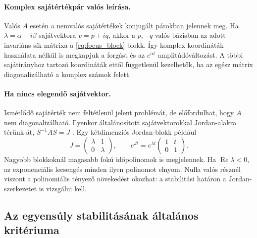 \paragraph*{Komplex sajátértékpár valós leírása.}
Valós $A$ esetén a nemvalós sajátértékek konjugált párokban jelennek meg. Ha $\lambda=\alpha+i\beta$ sajátvektora $v=p+iq$, akkor a $p,-q$ valós bázisban az adott invariáns sík mátrixa a \eqref{eq:focus_block} blokk. Így komplex koordináták használata nélkül is megkapjuk a forgást és az $e^{\alpha t}$ amplitúdóváltozást. A többi sajátirányhoz tartozó koordináták ettől függetlenül kezelhetők, ha az egész mátrix diagonalizálható a komplex számok felett.

\paragraph*{Ha nincs elegendő sajátvektor.}
Ismétlődő sajátérték nem feltétlenül jelent problémát, de előfordulhat, hogy $A$ nem diagonalizálható. Ilyenkor általánosított sajátvektorokkal Jordan-alakra térünk át, $S^{-1}AS=J$ \cite[A.1.4. szakasz, A.1. tétel]{kuznetsov_book}. Egy kétdimenziós Jordan-blokk például
\begin{equation}\label{eq:jordan_exponential}
J=\begin{pmatrix}\lambda&1\\0&\lambda\end{pmatrix},\qquad
e^{Jt}=e^{\lambda t}\begin{pmatrix}1&t\\0&1\end{pmatrix}.
\end{equation}
Nagyobb blokkoknál magasabb fokú időpolinomok is megjelennek. Ha $\operatorname{Re}\lambda<0$, az exponenciális lecsengés minden ilyen polinomot elnyom. Nulla valós résznél viszont a polinomiális tényező növekedést okozhat: a stabilitási határon a Jordan-szerkezetet is vizsgálni kell.

\subsection{Az egyensúly stabilitásának általános kritériuma}
